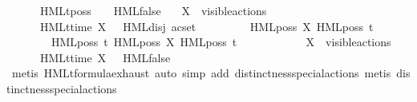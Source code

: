 \begin{isabellebody}
\ \ \ \ \ \ {\isasymsigma}{\isacharparenleft}{\kern0pt}HMLt{\isacharunderscore}{\kern0pt}poss\ {\isasymalpha}\ {\isasymphi}{\isacharparenright}{\kern0pt}\ {\isacharequal}{\kern0pt}\ HML{\isacharunderscore}{\kern0pt}false{\isacartoucheclose}\isanewline
\ \ {\isacharbar}{\kern0pt}\ {\isacartoucheopen}X\ {\isasymsubseteq}\ visible{\isacharunderscore}{\kern0pt}actions\ {\isasymLongrightarrow}\isanewline
\ \ \ \ \ \ {\isasymsigma}{\isacharparenleft}{\kern0pt}HMLt{\isacharunderscore}{\kern0pt}time\ X\ {\isasymphi}{\isacharparenright}{\kern0pt}\ {\isacharequal}{\kern0pt}\ HML{\isacharunderscore}{\kern0pt}disj\ {\isacharparenleft}{\kern0pt}acset\ {\isacharbraceleft}{\kern0pt}\isanewline
\ \ \ \ \ \ \ \ HML{\isacharunderscore}{\kern0pt}poss\ {\isasymepsilon}{\isacharbrackleft}{\kern0pt}X{\isacharbrackright}{\kern0pt}\ {\isacharparenleft}{\kern0pt}HML{\isacharunderscore}{\kern0pt}poss\ t\ {\isasymsigma}{\isacharparenleft}{\kern0pt}{\isasymphi}{\isacharparenright}{\kern0pt}{\isacharparenright}{\kern0pt}{\isacharcomma}{\kern0pt}\isanewline
\ \ \ \ \ \ \ \ HML{\isacharunderscore}{\kern0pt}poss\ t{\isacharunderscore}{\kern0pt}{\isasymepsilon}\ {\isacharparenleft}{\kern0pt}HML{\isacharunderscore}{\kern0pt}poss\ {\isasymepsilon}{\isacharbrackleft}{\kern0pt}X{\isacharbrackright}{\kern0pt}\ {\isacharparenleft}{\kern0pt}HML{\isacharunderscore}{\kern0pt}poss\ t\ {\isasymsigma}{\isacharparenleft}{\kern0pt}{\isasymphi}{\isacharparenright}{\kern0pt}{\isacharparenright}{\kern0pt}{\isacharparenright}{\kern0pt}\isanewline
\ \ \ \ \ \ {\isacharbraceright}{\kern0pt}{\isacharparenright}{\kern0pt}{\isacartoucheclose}\isanewline
\ \ {\isacharbar}{\kern0pt}\ {\isacartoucheopen}{\isasymnot}\ X\ {\isasymsubseteq}\ visible{\isacharunderscore}{\kern0pt}actions\ {\isasymLongrightarrow}\isanewline
\ \ \ \ \ \ {\isasymsigma}{\isacharparenleft}{\kern0pt}HMLt{\isacharunderscore}{\kern0pt}time\ X\ {\isasymphi}{\isacharparenright}{\kern0pt}\ {\isacharequal}{\kern0pt}\ HML{\isacharunderscore}{\kern0pt}false{\isacartoucheclose}\ \ \isanewline
%
\isadelimproof
\ \ %
\endisadelimproof
%
\isatagproof
{}\isamarkupfalse%
\ {\isacharparenleft}{\kern0pt}metis\ HMLt{\isacharunderscore}{\kern0pt}formula{\isachardot}{\kern0pt}exhaust{\isacharcomma}{\kern0pt}\ auto{\isacharplus}{\kern0pt}{\isacharcomma}{\kern0pt}\ {\isacharparenleft}{\kern0pt}simp\ add{\isacharcolon}{\kern0pt}\ distinctness{\isacharunderscore}{\kern0pt}special{\isacharunderscore}{\kern0pt}actions{\isacharparenleft}{\kern0pt}{}{\isacharcomma}{\kern0pt}{}{\isacharparenright}{\kern0pt}{\isacharparenright}{\kern0pt}{\isacharplus}{\kern0pt}{\isacharcomma}{\kern0pt}\ metis\ distinctness{\isacharunderscore}{\kern0pt}special{\isacharunderscore}{\kern0pt}actions{\isacharparenleft}{\kern0pt}{}{\isacharparenright}{\kern0pt}{\isacharparenright}{\kern0pt}%

\end{isabellebody}
